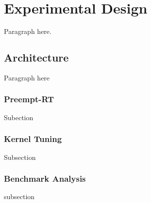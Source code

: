\chapter{Experimental Design}
\label{sec:experimental_design}

Paragraph here.

\section{Architecture}
\label{sec:architecture}
Paragraph here


\subsection{Preempt-RT}
Subection

\subsection{Kernel Tuning}
Subsection 

\subsection{Benchmark Analysis}
subsection








